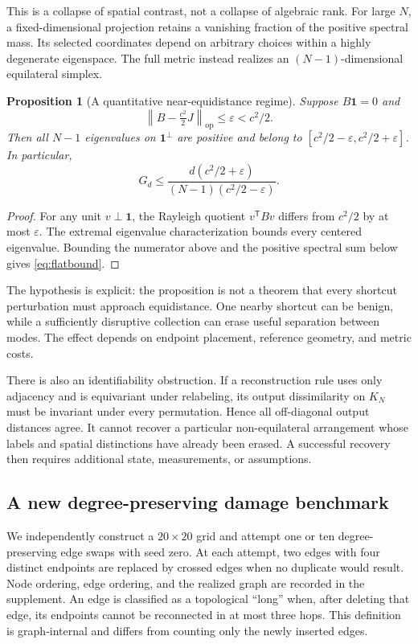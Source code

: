 \documentclass[11pt,letterpaper]{article}
\newtheorem{proposition}[theorem]{Proposition}
\theoremstyle{definition}
\theoremstyle{remark}
\newcommand{\one}{\mathbf 1}
\newcommand{\specnorm}[1]{\left\lVert #1\right\rVert_{\mathrm{op}}}
\begin{document}
This is a collapse of spatial contrast, not a collapse of algebraic rank. For large $N$, a fixed-dimensional projection retains a vanishing fraction of the positive spectral mass. Its selected coordinates depend on arbitrary choices within a highly degenerate eigenspace. The full metric instead realizes an $(N-1)$-dimensional equilateral simplex.

\begin{proposition}[A quantitative near-equidistance regime]\label{prop:flat}
Suppose $B\one=0$ and
\begin{equation}
 \specnorm{B-\tfrac{c^2}{2}J}\leq\varepsilon<c^2/2.
\end{equation}
Then all $N-1$ eigenvalues on $\one^\perp$ are positive and belong to $[c^2/2-\varepsilon,c^2/2+\varepsilon]$. In particular,
\begin{equation}
 G_d\leq
 \frac{d(c^2/2+\varepsilon)}{(N-1)(c^2/2-\varepsilon)}.
 \label{eq:flatbound}
\end{equation}
\end{proposition}
\begin{proof}
For any unit $v\perp\one$, the Rayleigh quotient $v^{\mathsf T}Bv$ differs from $c^2/2$ by at most $\varepsilon$. The extremal eigenvalue characterization bounds every centered eigenvalue. Bounding the numerator above and the positive spectral sum below gives \eqref{eq:flatbound}.
\end{proof}

The hypothesis is explicit: the proposition is not a theorem that every shortcut perturbation must approach equidistance. One nearby shortcut can be benign, while a sufficiently disruptive collection can erase useful separation between modes. The effect depends on endpoint placement, reference geometry, and metric costs.

There is also an identifiability obstruction. If a reconstruction rule uses only adjacency and is equivariant under relabeling, its output dissimilarity on $K_N$ must be invariant under every permutation. Hence all off-diagonal output distances agree. It cannot recover a particular non-equilateral arrangement whose labels and spatial distinctions have already been erased. A successful recovery then requires additional state, measurements, or assumptions.

\subsection{A new degree-preserving damage benchmark}
We independently construct a $20\times20$ grid and attempt one or ten degree-preserving edge swaps with seed zero. At each attempt, two edges with four distinct endpoints are replaced by crossed edges when no duplicate would result. Node ordering, edge ordering, and the realized graph are recorded in the supplement. An edge is classified as a topological ``long'' when, after deleting that edge, its endpoints cannot be reconnected in at most three hops. This definition is graph-internal and differs from counting only the newly inserted edges.
\end{document}

